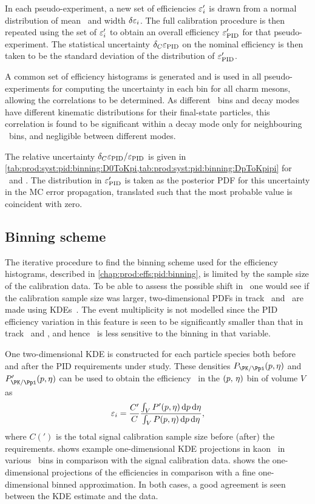 In each pseudo-experiment, a new set of efficiencies $\varepsilon_{i}'$ is drawn from a
normal distribution of mean \effi\ and width $\delta{\ensuremath{\varepsilon_{i}}}$.
The full calibration procedure is then repeated using the set of $\varepsilon_{i}'$ to
obtain an overall efficiency $\varepsilon_{\textnormal{PID}}'$ for that pseudo-experiment.
The statistical uncertainty $\delta_{C}{\varepsilon_{\textnormal{PID}}}$ on the nominal efficiency is
then taken to be the standard deviation of the distribution of $\varepsilon_{\textnormal{PID}}'$.

A common set of efficiency histograms is generated and is used in all
pseudo-experiments for computing the uncertainty in each bin for all charm
mesons, allowing the correlations to be determined.
As different \pTy\ bins and decay modes have different kinematic distributions
for their final-state particles, this correlation is found to be significant
within a decay mode only for neighbouring \pTy\ bins, and negligible between
different modes.

The relative uncertainty $\delta_{C}{\varepsilon_{\textnormal{PID}}}/\varepsilon_{\textnormal{PID}}$ is given in
\cref{tab:prod:syst:pid:binning:D0ToKpi,tab:prod:syst:pid:binning:DpToKpipi} for
\DzToKpi\ and \DpToKpipi.
The distribution in $\varepsilon_{\textnormal{PID}}'$ is taken as the posterior \ac{PDF} for this
uncertainty in the \ac{MC} error propagation, translated such that the most
probable value is coincident with zero.

\subsection{Binning scheme}
\label{chap:prod:syst:pid:binning}

The iterative procedure to find the binning scheme used for the efficiency
histograms, described in \cref{chap:prod:effs:pid:binning}, is limited by the
sample size of the calibration data.
To be able to assess the possible shift in \effpid\ one would see if the
calibration sample size was larger, two-dimensional \acp{PDF} in track \ptot\
and \Eta\ are made using \acp{KDE}~\cite{Poluektov:2014rxa}.
The event multiplicity is not modelled since the \ac{PID} efficiency variation
in this feature is seen to be significantly smaller than that in track \ptot\
and \Eta, and hence \effpid\ is less sensitive to the binning in that variable.

One two-dimensional \ac{KDE} is constructed for each particle species both
before and after the \ac{PID} requirements under study.
These densities $P_{\PK/\Ppi}(\ptot, \Eta)$ and $P'_{\PK/\Ppi}(\ptot, \Eta)$
can be used to obtain the efficiency \effi\ in the $(p,\,\eta)$ bin of
volume $V$ as
\begin{equation}
  \effi = \frac{C'}{C}\frac{%
    \int_{V} P'(\ptot,\Eta)\dif{p}\dif{\Eta}
  }{%
    \int_{V} P(\ptot,\Eta)\dif{p}\dif{\Eta}
  },
\end{equation}
where $C(')$ is the total signal calibration sample size before (after) the
requirements.
\Cref{fig:prod:syst:pid:kde_eta} shows example one-dimensional \ac{KDE}
projections in kaon \Eta\ in various \ptot\ bins in comparison with the signal
calibration data.
\Cref{fig:prod:syst:pid:kde_1d_binning} shows the one-dimensional projections
of the efficiencies in comparison with a fine one-dimensional binned
approximation.
In both cases, a good agreement is seen between the \ac{KDE} estimate and the
data.

